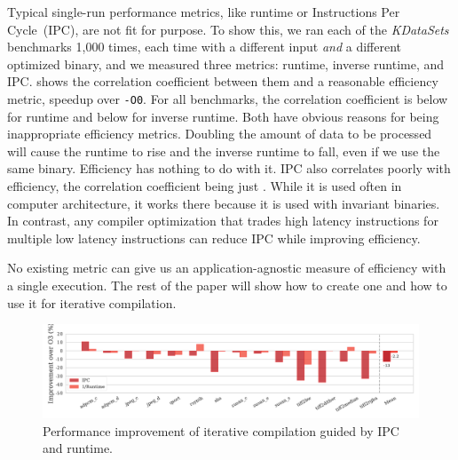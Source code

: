     Typical single-run performance metrics, like runtime or Instructions Per Cycle~(IPC), are not fit for purpose. To show this, we ran
    each of the  \textit{KDataSets} benchmarks 1,000 times, each time with a different input \textit{and} a different optimized
    binary, and we measured three metrics: runtime, inverse runtime, and IPC.  shows the correlation coefficient between
    them and a reasonable efficiency metric, speedup over \texttt{-O0}. For all benchmarks, the correlation coefficient is below
     for runtime and below  for inverse runtime. Both have obvious reasons for being inappropriate efficiency
    metrics. Doubling the amount of data to be processed will cause the runtime to rise and the inverse runtime to fall, even if we use the same binary.
    Efficiency has nothing to do with it. IPC also correlates poorly with efficiency, the correlation coefficient being just .
    While it is used often in computer architecture, it works there because it is used with invariant binaries. In contrast, any compiler
    optimization that trades high latency instructions for multiple low latency instructions can reduce IPC while improving efficiency.
    
    No existing metric can give us an application-agnostic measure of efficiency with a single execution. The rest of the paper will show
    how to create one and how to use it for iterative compilation. 


\begin{figure}[t]
    \centering
    \includegraphics[width=\textwidth]{figs/motivation-speedups.pdf}
    \caption{ Performance improvement of iterative compilation guided by IPC and runtime.}
    \label{fig:motivation-speedups}
\end{figure}

